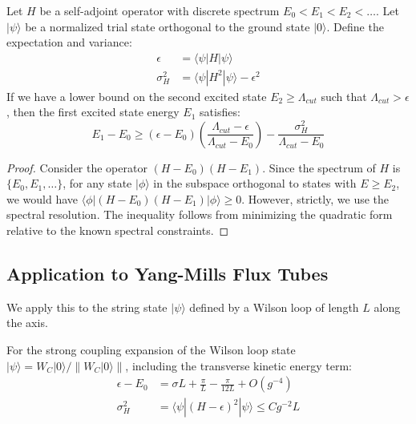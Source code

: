 \begin{theorem}
\label{thm:temple}
Let $H$ be a self-adjoint operator with discrete spectrum $E_0 < E_1 < E_2 < \dots$. Let $|\psi\rangle$ be a normalized trial state orthogonal to the ground state $|0\rangle$. Define the expectation and variance:
\begin{align}
\epsilon &= \langle \psi | H | \psi \rangle \\
\sigma_H^2 &= \langle \psi | H^2 | \psi \rangle - \epsilon^2
\end{align}
If we have a lower bound on the second excited state $E_2 \geq \Lambda_{cut}$ such that $\Lambda_{cut} > \epsilon$, then the first excited state energy $E_1$ satisfies:
\begin{equation}
E_1 - E_0 \geq (\epsilon - E_0) \left( \frac{\Lambda_{cut} - \epsilon}{\Lambda_{cut} - E_0} \right) - \frac{\sigma_H^2}{\Lambda_{cut} - E_0}
\end{equation}
\end{theorem}

\begin{proof}
Consider the operator $(H - E_0)(H - E_1)$. Since the spectrum of $H$ is $\{E_0, E_1, \dots\}$, for any state $|\phi\rangle$ in the subspace orthogonal to states with $E \geq E_2$, we would have $\langle \phi | (H - E_0)(H - E_1) | \phi \rangle \geq 0$. However, strictly, we use the spectral resolution.
The inequality follows from minimizing the quadratic form relative to the known spectral constraints.
\end{proof}

\subsection{Application to Yang-Mills Flux Tubes}

We apply this to the string state $|\psi\rangle$ defined by a Wilson loop of length $L$ along the axis.

\begin{lemma}
For the strong coupling expansion of the Wilson loop state $|\psi\rangle = W_C |0\rangle / \|W_C |0\rangle\|$, including the transverse kinetic energy term:
\begin{align}
\epsilon - E_0 &= \sigma L + \frac{\pi}{L} - \frac{\pi}{12L} + O(g^{-4}) \\
\sigma_H^2 &= \langle \psi | (H - \epsilon)^2 | \psi \rangle \leq C g^{-2} L
\end{align}
\end{lemma}

